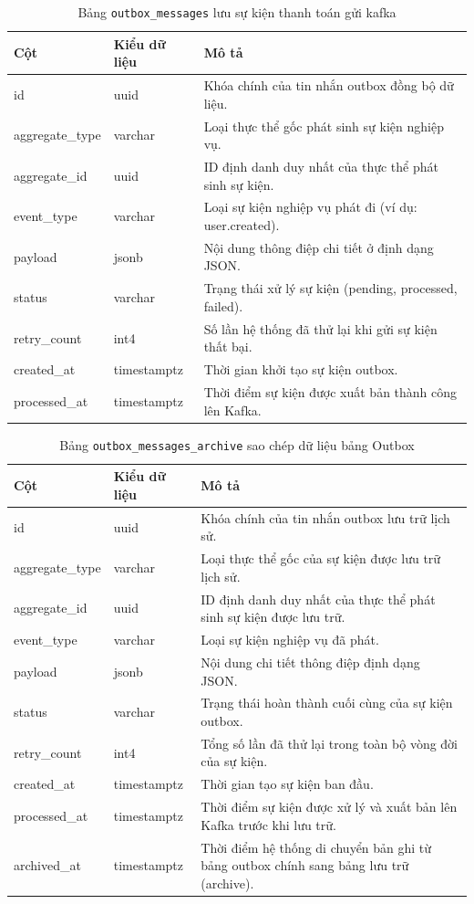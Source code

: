 \begin{table}[H]
\centering
\begin{tabular}{|l|l|p{6cm}|}
\hline
\textbf{Cột} & \textbf{Kiểu dữ liệu} & \textbf{Mô tả} \\ \hline
id & uuid & Khóa chính của tin nhắn outbox đồng bộ dữ liệu. \\ \hline
aggregate\_type & varchar & Loại thực thể gốc phát sinh sự kiện nghiệp vụ. \\ \hline
aggregate\_id & uuid & ID định danh duy nhất của thực thể phát sinh sự kiện. \\ \hline
event\_type & varchar & Loại sự kiện nghiệp vụ phát đi (ví dụ: user.created). \\ \hline
payload & jsonb & Nội dung thông điệp chi tiết ở định dạng JSON. \\ \hline
status & varchar & Trạng thái xử lý sự kiện (pending, processed, failed). \\ \hline
retry\_count & int4 & Số lần hệ thống đã thử lại khi gửi sự kiện thất bại. \\ \hline
created\_at & timestamptz & Thời gian khởi tạo sự kiện outbox. \\ \hline
processed\_at & timestamptz & Thời điểm sự kiện được xuất bản thành công lên Kafka. \\ \hline
\end{tabular}
\caption{Bảng \texttt{outbox\_messages} lưu sự kiện thanh toán gửi kafka}
\end{table}

\begin{table}[H]
\centering
\begin{tabular}{|l|l|p{6cm}|}
\hline
\textbf{Cột} & \textbf{Kiểu dữ liệu} & \textbf{Mô tả} \\ \hline
id & uuid & Khóa chính của tin nhắn outbox lưu trữ lịch sử. \\ \hline
aggregate\_type & varchar & Loại thực thể gốc của sự kiện được lưu trữ lịch sử. \\ \hline
aggregate\_id & uuid & ID định danh duy nhất của thực thể phát sinh sự kiện được lưu trữ. \\ \hline
event\_type & varchar & Loại sự kiện nghiệp vụ đã phát. \\ \hline
payload & jsonb & Nội dung chi tiết thông điệp định dạng JSON. \\ \hline
status & varchar & Trạng thái hoàn thành cuối cùng của sự kiện outbox. \\ \hline
retry\_count & int4 & Tổng số lần đã thử lại trong toàn bộ vòng đời của sự kiện. \\ \hline
created\_at & timestamptz & Thời gian tạo sự kiện ban đầu. \\ \hline
processed\_at & timestamptz & Thời điểm sự kiện được xử lý và xuất bản lên Kafka trước khi lưu trữ. \\ \hline
archived\_at & timestamptz & Thời điểm hệ thống di chuyển bản ghi từ bảng outbox chính sang bảng lưu trữ (archive). \\ \hline
\end{tabular}
\caption{Bảng \texttt{outbox\_messages\_archive} sao chép dữ liệu bảng Outbox}
\end{table}
